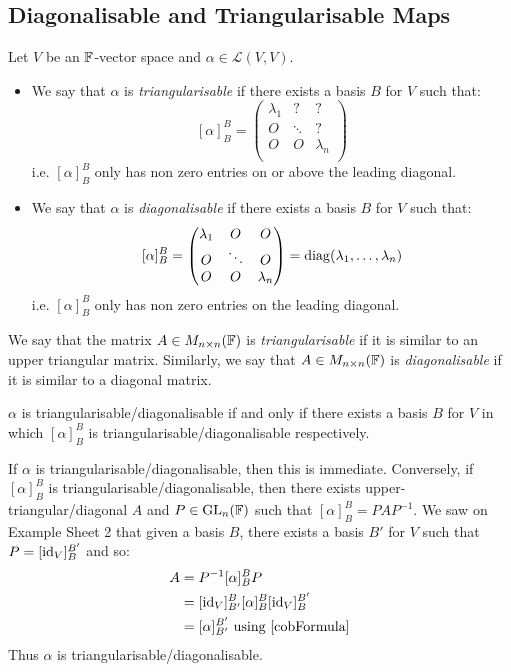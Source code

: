 \documentclass[../main.tex]{subfiles}
\begin{document}
\subsection{Diagonalisable and Triangularisable Maps}
\begin{definition}
  Let $V$ be an $\mathbb{F}$-vector space and $\alpha \in \mathcal{L}(V, V)$.
  \begin{itemize}
    \item We say that $\alpha$ is \textit{triangularisable} if there exists a basis $B$ for $V$ such that:
      \[
        [\alpha]^{B}_{B} = \begin{pmatrix}
        \lambda_1 & ? & ? \\
        O & \ddots & ? \\
        O & O & \lambda_n \\
        \end{pmatrix}
      \]
      i.e. $[\alpha]^{B}_{B}$ only has non zero entries on or above the leading diagonal.
    \item We say that $\alpha$ is \textit{diagonalisable} if there exists a basis $B$ for $V$ such that:
      \[
        [\alpha]^{B}_{B} = \begin{pmatrix}
        \lambda_1 & O & O \\
        O & \ddots & O \\
        O & O & \lambda_n \\
        \end{pmatrix} = \operatorname{diag}(\lambda_1, \ldots, \lambda_n)
      \]
      i.e. $[\alpha]^{B}_{B}$ only has non zero entries on the leading diagonal.
  \end{itemize}
\end{definition}
\begin{definition}
  We say that the matrix $A \in M_{n \times n}(\mathbb{F})$ is \textit{triangularisable} if it is similar to an upper triangular matrix.
  Similarly, we say that  $A \in M_{n \times n}(\mathbb{F})$ is \textit{diagonalisable} if it is similar to a diagonal matrix.
\end{definition}
\begin{remark}
  $\alpha$ is triangularisable/diagonalisable if and only if there exists a basis $B$ for $V$ in which $[\alpha]^{B}_{B}$ is triangularisable/diagonalisable respectively.

  If $\alpha$ is triangularisable/diagonalisable, then this is immediate.
  Conversely, if $[\alpha]^{B}_{B}$ is triangularisable/diagonalisable, then there exists upper-triangular/diagonal $A$ and $P \in \mathrm{GL}_n(\mathbb{F})$ such that $[\alpha]^{B}_{B} = PAP^{-1}$.
  We saw on Example Sheet 2 that given a basis $B$, there exists a basis $B'$ for $V$ such that $P = [\mathrm{id}_V]^{B'}_{B}$ and so:
  \begin{align*}
    A &= P^{-1} [\alpha]^{B}_{B} P \\
      &= [\id_V]^{B}_{B'} [\alpha]^{B}_{B} [\id_V]^{B'}_{B} \\
      &= [\alpha]^{B'}_{B'} \text{ using \cref{cobFormula}}
  \end{align*}
  Thus $\alpha$ is triangularisable/diagonalisable.
\end{remark}
\end{document}
